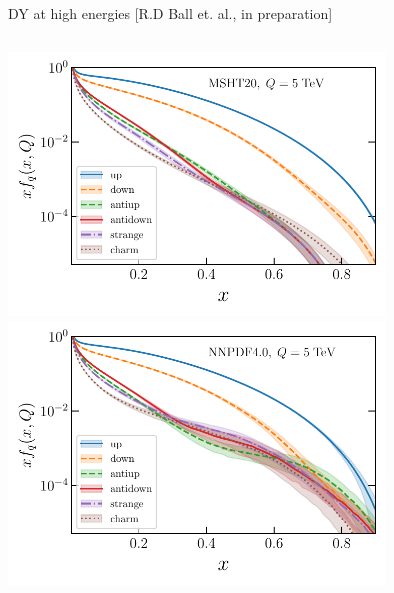 \documentclass[aspectratio=169,9pt]{beamer}
\begin{document}
\begin{frame}{DY at high energies [R.D Ball et. al., in preparation]}
\begin{columns}
\begin{column}{0.33\textwidth}
            \includegraphics[width=0.75\textwidth]{pdfplot-abslargex-msht20}\\
            \includegraphics[width=0.75\textwidth]{pdfplot-abslargex-nnpdf40}
        \end{column}
    \end{columns}
    \centering

\end{frame}
\end{document}
